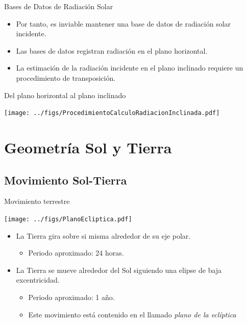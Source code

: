 \documentclass[xcolor={usenames,svgnames,dvipsnames}]{beamer}
\begin{document}
\begin{frame}[label={sec:org42a4a77}]{Bases de Datos de Radiación Solar}
\begin{itemize}
\item Por tanto, es inviable mantener una base de datos de radiación solar \alert{incidente}.
\item Las \alert{bases de datos} registran radiación en el \alert{plano horizontal}.
\item La estimación de la radiación incidente en el plano inclinado requiere un \alert{procedimiento de transposición}.
\end{itemize}
\end{frame}


\begin{frame}[label={sec:org4ffdfdc}]{Del plano horizontal al plano inclinado}
\begin{center}
\texttt{[image: ../figs/ProcedimientoCalculoRadiacionInclinada.pdf]}
\end{center}
\end{frame}

\section{Geometría Sol y Tierra}
\label{sec:orgdd018bf}
\subsection{Movimiento Sol-Tierra}
\label{sec:org4603df7}

\begin{frame}[label={sec:org4425dbf}]{Movimiento terrestre}
\begin{center}
\texttt{[image: ../figs/PlanoEcliptica.pdf]}
\end{center}

\begin{itemize}[<+->]
\item La Tierra \alert{gira sobre si misma} alrededor de su eje polar.
\begin{itemize}[<.->]
\item Periodo aproximado: 24 horas.
\end{itemize}

\item La Tierra se mueve \alert{alrededor del Sol} siguiendo una elipse de baja
excentricidad.
\begin{itemize}[<.->]
\item Periodo aproximado: 1 año.

\item Este movimiento está contenido en el llamado \emph{plano de la
eclíptica}
\end{itemize}
\end{itemize}
\end{frame}
\end{document}
